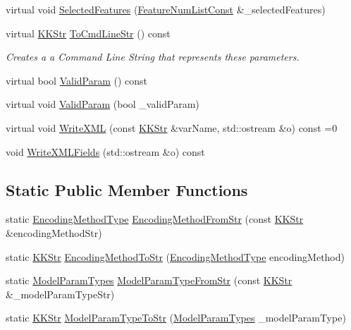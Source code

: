 \begin{DoxyCompactItemize}
\item 
virtual void \hyperlink{class_k_k_m_l_l_1_1_model_param_a1bda270736e567f30dee71c0b8b9be67}{Selected\+Features} (\hyperlink{namespace_k_k_m_l_l_ad276a9ed309552a63300bce930bdfebd}{Feature\+Num\+List\+Const} \&\+\_\+selected\+Features)
\item 
virtual \hyperlink{class_k_k_b_1_1_k_k_str}{K\+K\+Str} \hyperlink{class_k_k_m_l_l_1_1_model_param_aa4d9a12b145ecccb1eea6a373bcf5a34}{To\+Cmd\+Line\+Str} () const 
\begin{DoxyCompactList}\small\item\em Creates a a Command Line String that represents these parameters. \end{DoxyCompactList}\item 
virtual bool \hyperlink{class_k_k_m_l_l_1_1_model_param_a17fdd76812db160a1c43a650c49bf958}{Valid\+Param} () const 
\item 
virtual void \hyperlink{class_k_k_m_l_l_1_1_model_param_ad65d7b2671c429864fb1b6cd8406505f}{Valid\+Param} (bool \+\_\+valid\+Param)
\item 
virtual void \hyperlink{class_k_k_m_l_l_1_1_model_param_a298652e730d3d28be1e94970a424963c}{Write\+X\+ML} (const \hyperlink{class_k_k_b_1_1_k_k_str}{K\+K\+Str} \&var\+Name, std\+::ostream \&o) const  =0
\item 
void \hyperlink{class_k_k_m_l_l_1_1_model_param_a91dc06ec604cf9c2a045991e9b88b5d3}{Write\+X\+M\+L\+Fields} (std\+::ostream \&o) const 
\end{DoxyCompactItemize}
\subsection*{Static Public Member Functions}
\begin{DoxyCompactItemize}
\item 
static \hyperlink{class_k_k_m_l_l_1_1_model_param_a09e49f936f411dba6f08bdaf8d6b4a98}{Encoding\+Method\+Type} \hyperlink{class_k_k_m_l_l_1_1_model_param_a4aaa08b3e8e037ba1f8ac33b4389a53b}{Encoding\+Method\+From\+Str} (const \hyperlink{class_k_k_b_1_1_k_k_str}{K\+K\+Str} \&encoding\+Method\+Str)
\item 
static \hyperlink{class_k_k_b_1_1_k_k_str}{K\+K\+Str} \hyperlink{class_k_k_m_l_l_1_1_model_param_a9a8e3761bbc46b241b32c1f19c5f4ee3}{Encoding\+Method\+To\+Str} (\hyperlink{class_k_k_m_l_l_1_1_model_param_a09e49f936f411dba6f08bdaf8d6b4a98}{Encoding\+Method\+Type} encoding\+Method)
\item 
static \hyperlink{class_k_k_m_l_l_1_1_model_param_a5984a5fe225fdbe8e40fb5ec746a42d0}{Model\+Param\+Types} \hyperlink{class_k_k_m_l_l_1_1_model_param_ac99ea0981b7f58ab9926336563e3b1b0}{Model\+Param\+Type\+From\+Str} (const \hyperlink{class_k_k_b_1_1_k_k_str}{K\+K\+Str} \&\+\_\+model\+Param\+Type\+Str)
\item 
static \hyperlink{class_k_k_b_1_1_k_k_str}{K\+K\+Str} \hyperlink{class_k_k_m_l_l_1_1_model_param_aad6db641b658ff85787109df67ad0b8f}{Model\+Param\+Type\+To\+Str} (\hyperlink{class_k_k_m_l_l_1_1_model_param_a5984a5fe225fdbe8e40fb5ec746a42d0}{Model\+Param\+Types} \+\_\+model\+Param\+Type)
\end{DoxyCompactItemize}


